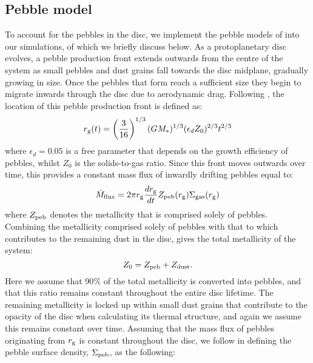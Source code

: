 \documentclass[a4paper,fleqn,usenatbib]{mnras}
\begin{document}
\subsection{Pebble model}
\label{sec:pebbles}
To account for the pebbles in the disc, we implement the pebble models of \citet{Lambrechts12,Lambrechts14} into our simulations, of which we briefly discuss below.
As a protoplanetary disc evolves, a pebble production front extends outwards from the centre of the system as small pebbles and dust grains fall towards the disc midplane, gradually growing in size.
Once the pebbles that form reach a sufficient size they begin to migrate inwards through the disc due to aerodynamic drag.
Following \citet{Lambrechts14}, the location of this pebble production front is defined as:
\begin{equation}
\label{eq:peb_front}
r_{\rm g}(t) = \left(\frac{3}{16}\right)^{1/3}(GM_*)^{1/3}(\epsilon_dZ_{0})^{2/3}t^{2/3}
\end{equation}
where $\epsilon_d = 0.05$ is a free parameter that depends on the growth efficiency of pebbles, whilst $Z_{0}$ is the solids-to-gas ratio.
Since this front moves outwards over time, this provides a constant mass flux of inwardly drifting pebbles equal to:
\begin{equation}
\label{eq:massflux}
\dot{M}_{\rm flux} = 2\pi r_{\rm g}\dfrac{dr_{\rm g}}{dt}Z_{\rm peb}(r_{\rm g})\Sigma_{\rm gas}(r_{\rm g})
\end{equation}
where $Z_{\rm peb}$ denotes the metallicity that is comprised solely of pebbles.
Combining the metallicity comprised solely of pebbles with that to which contributes to the remaining dust in the disc, gives the total metallicity of the system:
\begin{equation}
Z_{0} = Z_{\rm peb} + Z_{\rm dust}.
\end{equation}
Here we assume that 90$\%$ of the total metallicity is converted into pebbles, and that this ratio remains constant throughout the entire disc lifetime.
The remaining metallicity is locked up within small dust grains that contribute to the opacity of the disc when calculating its thermal structure, and again we assume this remains constant over time.
Assuming that the mass flux of pebbles originating from $r_{\rm g}$ is constant throughout the disc, we follow \citet{Lambrechts14} in defining the pebble surface density, $\Sigma_{\rm peb}$, as the following:
\end{document}
